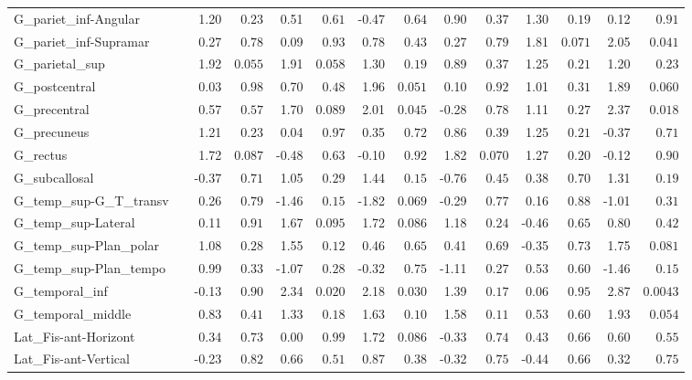 {\begin{longtable}{llrrrrrrrrrrrr}
G\_pariet\_inf-Angular &  & 1.20 & $0.23$ & 0.51 & $0.61$ & -0.47 & $0.64$ & 0.90 & $0.37$ & 1.30 & $0.19$ & 0.12 & $0.91$ \\
G\_pariet\_inf-Supramar &  & 0.27 & $0.78$ & 0.09 & $0.93$ & 0.78 & $0.43$ & 0.27 & $0.79$ & 1.81 & $0.071$ & 2.05 & $0.041$ \\
G\_parietal\_sup &  & 1.92 & $0.055$ & 1.91 & $0.058$ & 1.30 & $0.19$ & 0.89 & $0.37$ & 1.25 & $0.21$ & 1.20 & $0.23$ \\
G\_postcentral &  & 0.03 & $0.98$ & 0.70 & $0.48$ & 1.96 & $0.051$ & 0.10 & $0.92$ & 1.01 & $0.31$ & 1.89 & $0.060$ \\
G\_precentral &  & 0.57 & $0.57$ & 1.70 & $0.089$ & 2.01 & $0.045$ & -0.28 & $0.78$ & 1.11 & $0.27$ & 2.37 & $0.018$ \\
G\_precuneus &  & 1.21 & $0.23$ & 0.04 & $0.97$ & 0.35 & $0.72$ & 0.86 & $0.39$ & 1.25 & $0.21$ & -0.37 & $0.71$ \\
G\_rectus &  & 1.72 & $0.087$ & -0.48 & $0.63$ & -0.10 & $0.92$ & 1.82 & $0.070$ & 1.27 & $0.20$ & -0.12 & $0.90$ \\
G\_subcallosal &  & -0.37 & $0.71$ & 1.05 & $0.29$ & 1.44 & $0.15$ & -0.76 & $0.45$ & 0.38 & $0.70$ & 1.31 & $0.19$ \\
G\_temp\_sup-G\_T\_transv &  & 0.26 & $0.79$ & -1.46 & $0.15$ & -1.82 & $0.069$ & -0.29 & $0.77$ & 0.16 & $0.88$ & -1.01 & $0.31$ \\
G\_temp\_sup-Lateral &  & 0.11 & $0.91$ & 1.67 & $0.095$ & 1.72 & $0.086$ & 1.18 & $0.24$ & -0.46 & $0.65$ & 0.80 & $0.42$ \\
G\_temp\_sup-Plan\_polar &  & 1.08 & $0.28$ & 1.55 & $0.12$ & 0.46 & $0.65$ & 0.41 & $0.69$ & -0.35 & $0.73$ & 1.75 & $0.081$ \\
G\_temp\_sup-Plan\_tempo &  & 0.99 & $0.33$ & -1.07 & $0.28$ & -0.32 & $0.75$ & -1.11 & $0.27$ & 0.53 & $0.60$ & -1.46 & $0.15$ \\
G\_temporal\_inf &  & -0.13 & $0.90$ & 2.34 & $0.020$ & 2.18 & $0.030$ & 1.39 & $0.17$ & 0.06 & $0.95$ & 2.87 & $0.0043$ \\
G\_temporal\_middle &  & 0.83 & $0.41$ & 1.33 & $0.18$ & 1.63 & $0.10$ & 1.58 & $0.11$ & 0.53 & $0.60$ & 1.93 & $0.054$ \\
Lat\_Fis-ant-Horizont &  & 0.34 & $0.73$ & 0.00 & $0.99$ & 1.72 & $0.086$ & -0.33 & $0.74$ & 0.43 & $0.66$ & 0.60 & $0.55$ \\
Lat\_Fis-ant-Vertical &  & -0.23 & $0.82$ & 0.66 & $0.51$ & 0.87 & $0.38$ & -0.32 & $0.75$ & -0.44 & $0.66$ & 0.32 & $0.75$ \\

\end{longtable}}
